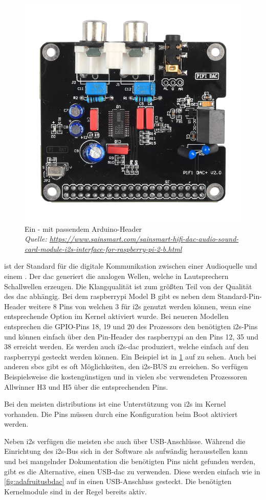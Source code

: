 \documentclass[12pt,a4paper,hidelinks]{scrreprt}
\newcommand{\myref}[1]{\cref{#1} auf \cpageref{#1}}
\begin{document}
	\begin{figure}
	\centering
	\includegraphics[width=0.5\linewidth]{./img/SainSmart_HIFI_DAC.jpeg}
	\caption{Ein - mit passendem Arduino-Header \\
	\tiny\textit{Quelle: \url{https://www.sainsmart.com/sainsmart-hifi-dac-audio-sound-card-module-i2s-interface-for-raspberry-pi-2-b.html}}}
	\label{fig:sainsmarthifidac}
	\end{figure}
	
	
	 ist der Standard für die digitale Kommunikation zwischen einer Audioquelle und einem . 
	Der \gls{dac} generiert die analogen Wellen, welche in Lautsprechern Schallwellen erzeugen. Die Klangqualität ist zum größten Teil von der Qualität des \gls{dac} abhängig.
	Bei dem \gls{raspberrypi} Model B gibt es neben dem Standard-Pin-Header weitere 8 Pins von welchen 3 für \gls{i2s} genutzt werden können, wenn eine entsprechende Option im Kernel aktiviert wurde. \cite{jaekelrpidac}
	Bei neueren Modellen entsprechen die GPIO-Pins 18, 19 und 20 des Prozessors den benötigten \gls{i2s}-Pins und können einfach über den Pin-Header des \gls{raspberrypi} an den Pins 12, 35 und 38 erreicht werden. \cite{smithrpidac} Es werden auch \gls{i2s}-\gls{dac} produziert, welche einfach auf den \gls{raspberrypi} gesteckt werden können. Ein Beispiel ist in \myref{fig:sainsmarthifidac} zu sehen.
	Auch bei anderen \glspl{sbc} gibt es oft Möglichkeiten, den \gls{i2s}-BUS zu erreichen. So verfügen Beispielsweise die kostengünstigen und in vielen \gls{sbc} verwendeten Prozessoren Allwinner H3 und H5 über die entsprechenden Pins. 
	
	Bei den meisten \glspl{distribution} ist eine Unterstützung von \gls{i2s} im Kernel vorhanden. Die Pins müssen durch eine Konfiguration beim Boot aktiviert werden.
	
	Neben \gls{i2s} verfügen die meisten \gls{sbc} auch über USB-Anschlüsse. Während die Einrichtung des \gls{i2s}-Bus sich in der Software als aufwändig herausstellen kann und bei mangelnder Dokumentation die benötigten Pins nicht gefunden werden, gibt es die Alternative, einen USB-\gls{dac} zu verwenden. Diese werden einfach wie in \myref{fig:adafruitusbdac} in einen USB-Anschluss gesteckt. Die benötigten Kernelmodule sind in der Regel bereits aktiv. 
	
\end{document}
